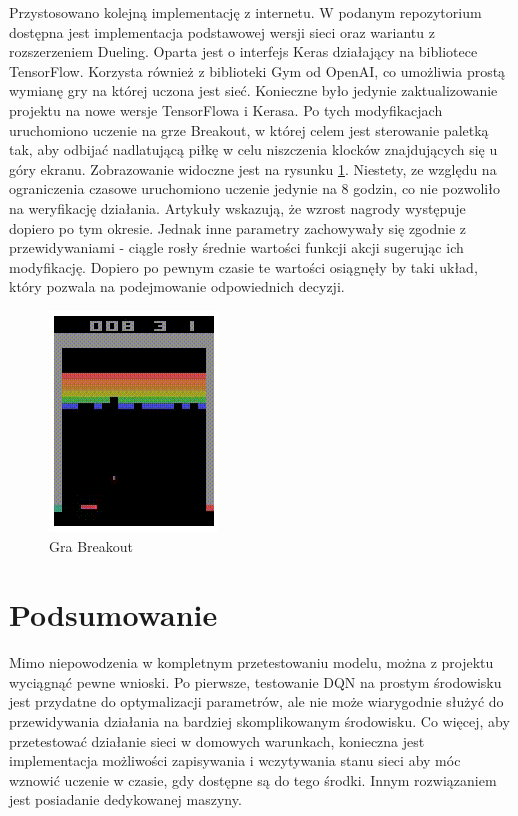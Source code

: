 \documentclass[preprint,12pt]{elsarticle}
\begin{document}
Przystosowano kolejną implementację z internetu\cite{implementation2}. W podanym repozytorium dostępna jest implementacja podstawowej wersji sieci oraz wariantu z rozszerzeniem Dueling. Oparta jest o interfejs Keras działający na bibliotece TensorFlow. Korzysta również z biblioteki Gym od OpenAI, co umożliwia prostą wymianę gry na której uczona jest sieć. Konieczne było jedynie zaktualizowanie projektu na nowe wersje TensorFlowa i Kerasa. Po tych modyfikacjach uruchomiono uczenie na grze Breakout, w której celem jest sterowanie paletką tak, aby odbijać nadlatującą piłkę w celu niszczenia klocków znajdujących się u góry ekranu. Zobrazowanie widoczne jest na rysunku \ref{breakout}. Niestety, ze względu na ograniczenia czasowe uruchomiono uczenie jedynie na 8 godzin, co nie pozwoliło na weryfikację działania. Artykuły wskazują, że wzrost nagrody występuje dopiero po tym okresie. Jednak inne parametry zachowywały się zgodnie z przewidywaniami - ciągle rosły średnie wartości funkcji akcji sugerując ich modyfikację. Dopiero po pewnym czasie te wartości osiągnęły by taki układ, który pozwala na podejmowanie odpowiednich decyzji.

\begin{figure}[h]
\centering
\includegraphics[width=0.4\linewidth]{test2.png}
\caption{Gra Breakout}
\label{breakout}
\end{figure}

\section{Podsumowanie}

Mimo niepowodzenia w kompletnym przetestowaniu modelu, można z projektu wyciągnąć pewne wnioski. Po pierwsze, testowanie DQN na prostym środowisku jest przydatne do optymalizacji parametrów, ale nie może wiarygodnie służyć do przewidywania działania na bardziej skomplikowanym środowisku. Co więcej, aby przetestować działanie sieci w domowych warunkach, konieczna jest implementacja możliwości zapisywania i wczytywania stanu sieci aby móc wznowić uczenie w czasie, gdy dostępne są do tego środki. Innym rozwiązaniem jest posiadanie dedykowanej maszyny. 
\end{document}
